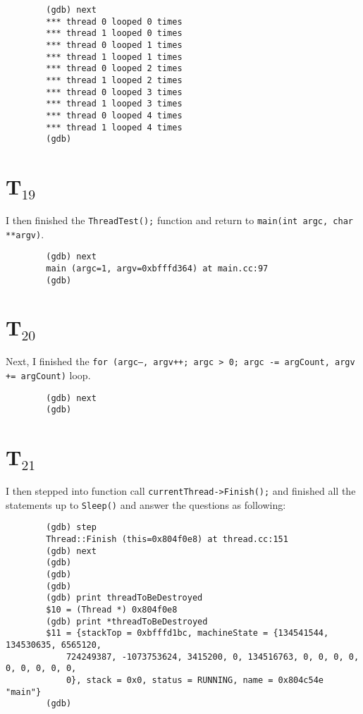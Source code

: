 \documentclass[letterpaper, 10pt]{article}
\begin{document}
	\begin{verbatim}
		(gdb) next
		*** thread 0 looped 0 times
		*** thread 1 looped 0 times
		*** thread 0 looped 1 times
		*** thread 1 looped 1 times
		*** thread 0 looped 2 times
		*** thread 1 looped 2 times
		*** thread 0 looped 3 times
		*** thread 1 looped 3 times
		*** thread 0 looped 4 times
		*** thread 1 looped 4 times
		(gdb)
	\end{verbatim}

	\section*{T$_{19}$}

	I then finished the {\tt ThreadTest();} function and return to {\tt main(int argc, char **argv)}.

	\begin{verbatim}
		(gdb) next
		main (argc=1, argv=0xbfffd364) at main.cc:97
		(gdb)
	\end{verbatim}

	\section*{T$_{20}$}

	Next, I finished the {\tt for (argc--, argv++; argc > 0; argc -= argCount, argv += argCount)} loop.

	\begin{verbatim}
		(gdb) next
		(gdb)
	\end{verbatim}

	\section*{T$_{21}$}

	I then stepped into function call {\tt currentThread->Finish();} and finished all the statements up to {\tt Sleep()} and answer the questions as following:

	\begin{verbatim}
		(gdb) step
		Thread::Finish (this=0x804f0e8) at thread.cc:151
		(gdb) next
		(gdb)
		(gdb)
		(gdb)
		(gdb) print threadToBeDestroyed
		$10 = (Thread *) 0x804f0e8
		(gdb) print *threadToBeDestroyed
		$11 = {stackTop = 0xbfffd1bc, machineState = {134541544, 134530635, 6565120,
			724249387, -1073753624, 3415200, 0, 134516763, 0, 0, 0, 0, 0, 0, 0, 0, 0,
			0}, stack = 0x0, status = RUNNING, name = 0x804c54e "main"}
		(gdb)
	\end{verbatim}
\end{document}
